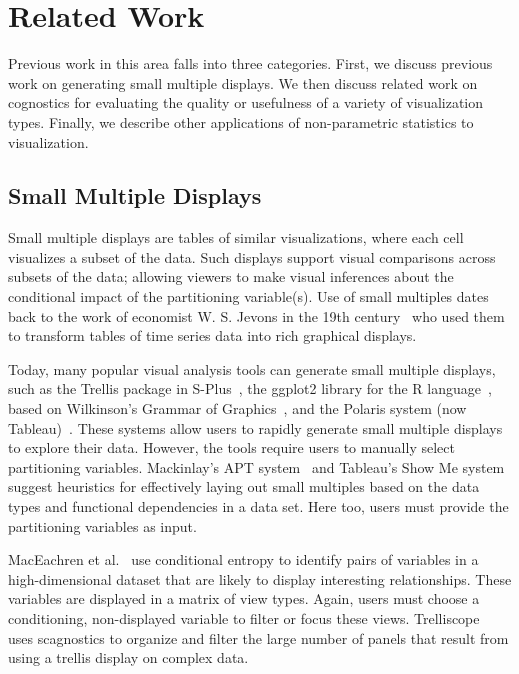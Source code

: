 \section{Related Work}
\label{sec:related}
Previous work in this area falls into three categories. First, we discuss previous work on generating small multiple displays. We then discuss related work on cognostics for evaluating the quality or usefulness of a variety of visualization types. Finally, we describe other applications of non-parametric statistics to visualization.

\subsection{Small Multiple Displays}
Small multiple displays are tables of similar visualizations, where each cell visualizes a subset of the data. Such displays support visual comparisons across subsets of the data; allowing viewers to make visual inferences about the conditional impact of the partitioning variable(s). Use of small multiples dates back to the work of economist W. S. Jevons in the 19th century~\cite{Kelley1973} who used them to transform tables of time series data into rich graphical displays. 

Today, many popular visual analysis tools can generate small multiple displays, such as the Trellis package in S-Plus~\cite{Becker1996-manual}, the ggplot2 library for the R language~\cite{Wickham2006}, based on Wilkinson's Grammar of Graphics~\cite{Wilkinson2005}, and the Polaris system (now Tableau)~\cite{Stolte2002}. These systems allow users to rapidly generate small multiple displays to explore their data. However, the tools require users to manually select partitioning variables. Mackinlay's APT system~\cite{mackinlay1986} and Tableau's Show Me system~\cite{mackinlay2007} suggest heuristics for effectively laying out small multiples based on the data types and functional dependencies in a data set. Here too, users must provide the partitioning variables as input. 

MacEachren et al.~\cite{Maceachren2003} use conditional entropy to identify pairs of variables in a high-dimensional dataset that are likely to display interesting relationships. These variables are displayed in a matrix of view types. Again, users must choose a conditioning, non-displayed variable to filter or focus these views. Trelliscope~\cite{Hafen2013} uses scagnostics to organize and filter the large number of panels that result from using a trellis display on complex data.

